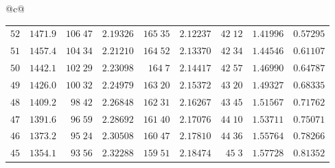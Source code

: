 \begin{center}
{\begin{tabular}{@{}c@{}}
\begin{tabular}{r|r|r|r|r|r|r|r|r}
$52$&$1471.9$&$106\;47$&$2.19326$&$165\;35$&$2.12237$&$42\;12$&$1.41996$&$0.57295$\\
$51$&$1457.4$&$104\;34$&$2.21210$&$164\;52$&$2.13370$&$42\;34$&$1.44546$&$0.61107$\\[2pt]
$50$&$1442.1$&$102\;29$&$2.23098$&$164\;7$&$2.14417$&$42\;57$&$1.46990$&$0.64787$\\
$49$&$1426.0$&$100\;32$&$2.24979$&$163\;20$&$2.15372$&$43\;20$&$1.49327$&$0.68335$\\
$48$&$1409.2$&$98\;42$&$2.26848$&$162\;31$&$2.16267$&$43\;45$&$1.51567$&$0.71762$\\
$47$&$1391.6$&$96\;59$&$2.28692$&$161\;40$&$2.17076$&$44\;10$&$1.53711$&$0.75071$\\
$46$&$1373.2$&$95\;24$&$2.30508$&$160\;47$&$2.17810$&$44\;36$&$1.55764$&$0.78266$\\[2pt]
$45$&$1354.1$&$93\;56$&$2.32288$&$159\;51$&$2.18474$&$45\;3$&$1.57728$&$0.81352$\\
\end{tabular}
\end{tabular}%
}
\end{center}
\endgroup
\clearpage
{}
\begingroup
\fontsize{9}{10.2}\selectfont
\setlength{\tabcolsep}{1.5pt}
\renewcommand{\arraystretch}{1.02}
